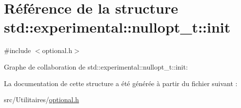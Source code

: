 \hypertarget{structstd_1_1experimental_1_1nullopt__t_1_1init}{}\section{Référence de la structure std\+:\+:experimental\+:\+:nullopt\+\_\+t\+:\+:init}
\label{structstd_1_1experimental_1_1nullopt__t_1_1init}


{\ttfamily \#include $<$optional.\+h$>$}



Graphe de collaboration de std\+:\+:experimental\+:\+:nullopt\+\_\+t\+:\+:init\+:


La documentation de cette structure a été générée à partir du fichier suivant \+:\begin{DoxyCompactItemize}
\item 
src/\+Utilitaires/\hyperlink{optional_8h}{optional.\+h}\end{DoxyCompactItemize}
